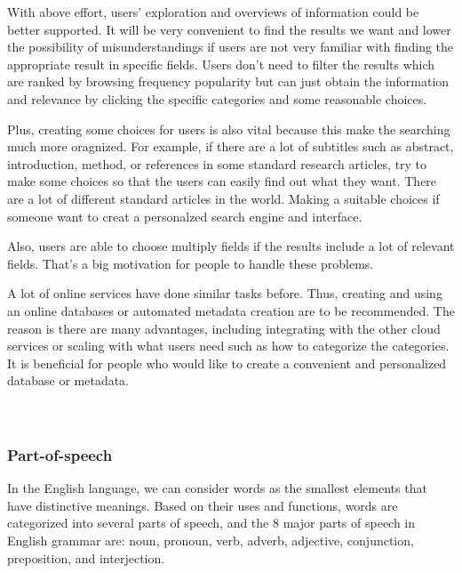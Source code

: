 With above effort, users' exploration and overviews of information could be better supported. It will be very convenient to find the results we want and lower the possibility of misunderstandings if users are not very familiar with finding the appropriate result in specific fields.
\cite{TunThuraThet2010} Users don't need to filter the results which are ranked by browsing frequency popularity but can just obtain the information and relevance by clicking the specific categories and some reasonable choices.

Plus, creating some choices for users is also vital because this make the searching much more oragnized. 
For example, if there are a lot of subtitles such as abstract, introduction, method, or references in some standard research articles, try to make some choices so that the users can easily find out what they want. 
There are a lot of different standard articles in the world.
 Making a suitable choices if someone want to creat a personalzed search engine and interface. 

Also, users are able to choose multiply fields if the results include a lot of relevant fields. 
That's a big motivation for people to handle these problems. 

A lot of online services have done similar tasks before. 
Thus, creating and using an online databases or automated metadata creation are to be recommended. 
The reason is there are many advantages, including integrating with the other cloud services or scaling with what users need such as how to categorize the categories. 
It is beneficial for people who would like to create a convenient and personalized database or metadata.\\\\\\


\subsubsection*{Part-of-speech}

In the English language, we can consider words as the smallest elements that have distinctive meanings. 
Based on their uses and functions, words are categorized into several parts of speech, and the 8 major parts of speech in English grammar are: noun, pronoun, verb, adverb, adjective, conjunction, preposition, and interjection.

